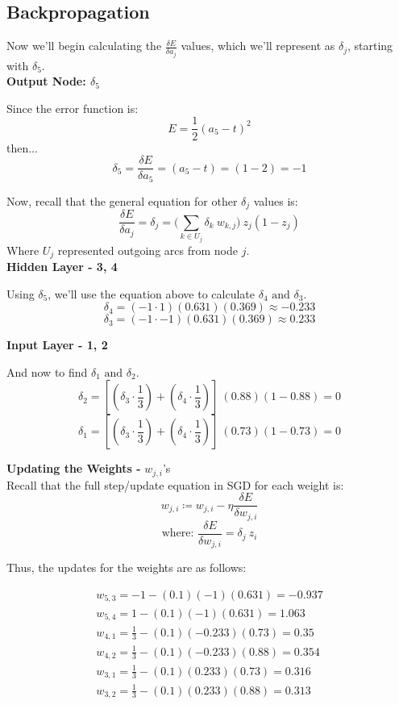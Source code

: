 \documentclass[11pt]{article}
\begin{document}
\subsection{Backpropagation}
Now we'll begin calculating the $\frac{\delta E}{\delta a_j}$ values, which we'll represent as $\delta_j$, starting with $\delta_5$.\\

\textbf{Output Node: $\delta_5$}
\begin{center}
Since the error function is:
\[E = \frac{1}{2}(a_5 - t)^2\]
then...
\[\delta_5 = \frac{\delta E}{\delta a_5} = (a_5 -t) = (1-2) = -1\]
\end{center}

Now, recall that the general equation for other $\delta_j$ values is:
\[\frac{\delta E}{\delta a_j} = \delta_j = \bigg( \sum_{k\in U_j} \delta_k \ w_{k, j}\bigg) \ z_j(1-z_j)\]
\indent Where $U_j$ represented outgoing arcs from node $j$.\\

\textbf{Hidden Layer - 3, 4}
\begin{center}
Using $\delta_5$, we'll use the equation above to calculate $\delta_4 \text{ and } \delta_3$.
\[ \delta_4 = (-1  \cdot 1)(0.631)(0.369) \approx -0.233 \]
\[ \delta_3 = (-1  \cdot -1)(0.631)(0.369) \approx 0.233 \]
\end{center}

\textbf{Input Layer - 1, 2}
\begin{center}
And now to find $\delta_1 \text{ and } \delta_2.$
\[ \delta_2 = [(\delta_3 \cdot \frac{1}{3}) + (\delta_4 \cdot \frac{1}{3})] \ (0.88)(1-0.88) = 0 \]
\[ \delta_1 = [(\delta_3 \cdot \frac{1}{3}) + (\delta_4 \cdot \frac{1}{3})] \ (0.73)(1-0.73) = 0 \]
\end{center}


\textbf{Updating the Weights - }$w_{j,i}$'s\\

Recall that the full step/update equation in SGD for each weight is:
\[ w_{j,i} \coloneqq w_{j,i}  -  \eta \frac{\delta E}{\delta w_{j,i}} \]
\[\text{where: } \frac{\delta E}{\delta w_{j,i}} = \delta_j \ z_i \]
\pagebreak

Thus, the updates for the weights are as follows:
\begin{center}
\begin{gather*}
w_{5, 3} = -1 - (0.1)(-1)(0.631) = -0.937\\
w_{5, 4} = 1 - (0.1)(-1)(0.631) = 1.063\\
w_{4, 1} = \frac{1}{3} - (0.1)(-0.233)(0.73) = 0.35\\
w_{4, 2} = \frac{1}{3} - (0.1)(-0.233)(0.88) = 0.354\\
w_{3, 1} = \frac{1}{3} - (0.1)(0.233)(0.73) = 0.316\\
w_{3, 2} = \frac{1}{3} - (0.1)(0.233)(0.88) = 0.313
\end{gather*}
\end{center}
\end{document}
